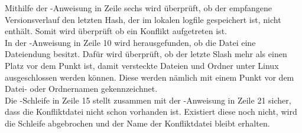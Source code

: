 Mithilfe der -Anweisung in Zeile sechs wird überprüft, ob der empfangene Versionsverlauf den letzten Hash, der im lokalen \gls{logfile} gespeichert ist, nicht enthält. Somit wird überprüft ob ein Konflikt aufgetreten ist. \\
In der -Anweisung in Zeile 10 wird herausgefunden, ob die Datei eine Dateiendung besitzt. Dafür wird überprüft, ob der letzte Slash mehr als einen Platz vor dem Punkt ist, damit versteckte Dateien und Ordner unter Linux ausgeschlossen werden können. Diese werden nämlich mit einem Punkt vor dem Datei- oder Ordnernamen gekennzeichnet.\\
Die -Schleife in Zeile 15 stellt zusammen mit der -Anweisung in Zeile 21 sicher, dass die Konfliktdatei nicht schon vorhanden ist. Existiert diese noch nicht, wird die Schleife abgebrochen und der Name der Konfliktdatei bleibt erhalten.